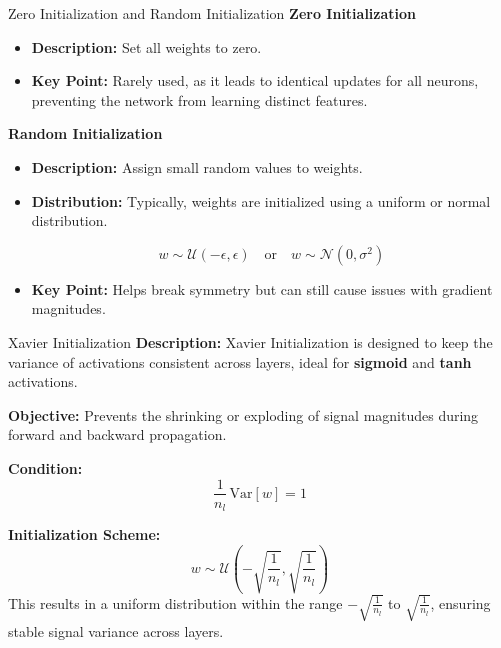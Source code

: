 \documentclass[serif, aspectratio=169]{beamer}
\begin{document}
\begin{frame}{Zero Initialization and Random Initialization}
\textbf{Zero Initialization}
\begin{itemize}
     

   \item \textbf{Description:} Set all weights to zero.
    
   \item \textbf{Key Point:} Rarely used, as it leads to identical updates for all neurons, preventing the network from learning distinct features.
    \end{itemize}
    \textbf{Random Initialization}
\begin{itemize}
   \item \textbf{Description:} Assign small random values to weights.
    
    \item \textbf{Distribution:} Typically, weights are initialized using a uniform or normal distribution.
    
    \[
    w \sim \mathcal{U}(-\epsilon, \epsilon) \quad \text{or} \quad w \sim \mathcal{N}(0, \sigma^2)
    \]
    
   \item \textbf{Key Point:} Helps break symmetry but can still cause issues with gradient magnitudes.
   \end{itemize}
   
\end{frame}
\begin{frame}{Xavier Initialization}
    \textbf{Description:} 
    Xavier Initialization is designed to keep the variance of activations consistent across layers, ideal for \textbf{sigmoid} and \textbf{tanh} activations.

    \textbf{Objective:} 
    Prevents the shrinking or exploding of signal magnitudes during forward and backward propagation.

    \textbf{Condition:}
    \[
    \frac{1}{n_l} \, \text{Var}[w] = 1
    \]

    \textbf{Initialization Scheme:}
    \[
    w \sim \mathcal{U}\left(-\sqrt{\frac{1}{n_l}}, \sqrt{\frac{1}{n_l}}\right)
    \]
    This results in a uniform distribution within the range \(-\sqrt{\frac{1}{n_l}}\) to \(\sqrt{\frac{1}{n_l}}\), ensuring stable signal variance across layers.
\end{frame}
\end{document}
